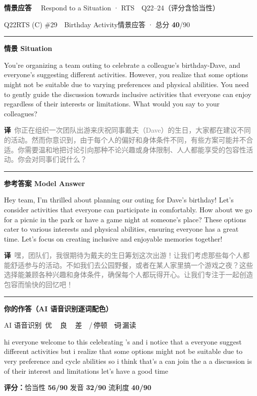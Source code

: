 \documentclass[11pt]{article}
\newcommand{\spart}[1]{\textcolor{cPartial}{\bfseries #1}} %
\newcommand{\ptesub}[1]{%
  \par\needspace{2\baselineskip}\smallskip
  {\color{cAccent}\rule[-0.2ex]{3pt}{1.05em}}\hspace{6pt}%
  {\bfseries\color{cHead}#1}\par\nopagebreak\smallskip}
\newcommand{\ptetask}[2]{%
  \addcontentsline{toc}{subsection}{#1\ #2}%
  \needspace{4\baselineskip}\medskip
  \begin{tcolorbox}[enhanced, colback=cHead, colframe=cHead, sharp corners,
     left=12pt, right=12pt, top=5pt, bottom=5pt, boxrule=0pt]
    {\large\bfseries\color{white} #1}\ \ {\color{white!80} #2}
  \end{tcolorbox}\smallskip}
\newcommand{\sg}[1]{\textcolor{cSpkGood}{#1}}   %
\newcommand{\sy}[1]{\textcolor{cSpkOk}{#1}}     %
\newcommand{\sr}[1]{\textcolor{cSpkBad}{#1}}    %
\newcommand{\asrlegend}{{\footnotesize\color{gray}AI 语音识别\quad
  {\color{cSpkGood}\textbullet}\,优\ \ {\color{cSpkOk}\textbullet}\,良\ \
  {\color{cSpkBad}\textbullet}\,差\ \ {\color{gray}/}\,停顿\ \
  {\color{cSpkBad}\sout{词}}\,漏读}}
\newcommand{\zh}[1]{{\footnotesize\textcolor{cNote}{\textbf{译}}\ \textcolor{gray}{#1}}}
\begin{document}
\ptetask{情景应答}{Respond to a Situation · RTS　Q22--24（评分含恰当性）}
\begin{qblock}{Q22\quad RTS (C) \#29\ \ Birthday Activity}{情景应答 · 总分 \textcolor{cAccent}{\bfseries 40}/90}
\ptesub{情景 Situation}
\begin{promptbox}
You're organizing a team outing to celebrate a colleague's birthday-Dave, and everyone's suggesting different activities. However, you realize that some options might not be suitable due to varying preferences and physical abilities. You need to gently guide the discussion towards inclusive activities that everyone can enjoy regardless of their interests or limitations. What would you say to your colleagues?
\end{promptbox}
\zh{你正在组织一次团队出游来庆祝同事戴夫（Dave）的生日，大家都在建议不同的活动。然而你意识到，由于每个人的偏好和身体条件不同，有些方案可能并不合适。你需要温和地把讨论引向那种不论兴趣或身体限制、人人都能享受的包容性活动。你会对同事们说什么？}
\ptesub{参考答案 Model Answer}
\begin{modelbox}
Hey team, I'm thrilled about planning our outing for Dave's birthday! Let's consider activities that everyone can participate in comfortably. How about we go for a picnic in the park or have a game night at someone's place? These options cater to various interests and physical abilities, ensuring everyone has a great time. Let's focus on creating inclusive and enjoyable memories together!
\end{modelbox}
\zh{嘿，团队们，我很期待为戴夫的生日筹划这次出游！让我们考虑那些每个人都能舒适参与的活动。不如我们去公园野餐，或者在某人家里搞一个游戏之夜？这些选择能兼顾各种兴趣和身体条件，确保每个人都玩得开心。让我们专注于一起创造包容而愉快的回忆吧！}
\ptesub{你的作答（AI 语音识别逐词配色）}
\asrlegend
\begin{asrbox}
\sy{hi} \sg{everyone} \sy{welcome} \sg{to} \sg{this} \sg{celebrating} \sg{'s} \sg{and} \sy{i} \sg{notice} \sg{that} \sy{a} \sg{everyone} \sy{suggest} \sg{different} \sg{activities} \sg{but} \sg{i} \sy{realize} \sg{that} \sg{some} \sg{options} \sg{might} \sg{not} \sg{be} \sg{suitable} \sg{due} \sg{to} \sy{very} \sy{preference} \sg{and} \sg{cycle} \sg{abilities} \sg{so} \sg{i} \sy{think} \sr{that's} \sr{a} \sy{can} \sg{join} \sg{the} \sr{a} \sr{a} \sy{discussion} \sr{is} \sy{of} \sy{their} \sg{interest} \sy{and} \sg{limitations} \sy{let's} \sg{have} \sg{a} \sg{good} \sg{time}
\end{asrbox}
\smallskip
{\small\textbf{评分：}恰当性 \spart{56/90} \quad\textperiodcentered\quad 发音 \spart{32/90} \quad\textperiodcentered\quad 流利度 \spart{40/90}}
\end{qblock}
\end{document}
